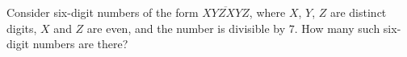 Consider six-digit numbers of the form $\overline{XYZXYZ}$, where $X$, $Y$, $Z$ are distinct digits, $X$ and $Z$ are even, and the number is divisible by $7$. How many such six-digit numbers are there?
